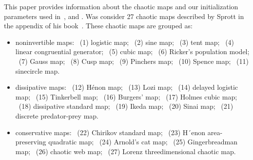 \documentclass[11pt]{article}
\begin{document}
This paper provides information about the chaotic maps and our initialization parameters used in~, and .
Was consider 27 chaotic maps described by Sprott in the appendix of his book~\cite{sprott2003chaos}. 
These chaotic maps are grouped as:
\begin{itemize}
    \item noninvertible maps: 
    ~(1) logistic map; 
    ~(2) sine map; 
    ~(3) tent map; 
    ~(4) linear congruential generator; 
    ~(5) cubic map; 
    ~(6) Ricker’s population model; 
    ~(7) Gauss map; 
    ~(8) Cusp map; 
    ~(9) Pinchers map; 
    ~(10) Spence map; 
    ~(11) sinecircle map.
    \item  dissipative maps: 
    ~(12) Hénon map; 
    ~(13) Lozi map;
    ~(14) delayed logistic map; 
    ~(15) Tinkerbell map; 
    ~(16) Burgers’ map; 
    ~(17) Holmes cubic map; 
    ~(18) dissipative standard map; 
    ~(19) Ikeda map; 
    ~(20) Sinai map; 
    ~(21) discrete predator-prey map.
    \item conservative maps: 
    ~(22) Chirikov standard map; 
    ~(23) H´enon area-preserving quadratic map; 
    ~(24) Arnold’s cat map; 
    ~(25) Gingerbreadman map; 
    ~(26) chaotic web map; 
    ~(27) Lorenz threedimensional chaotic map.
\end{itemize}
\newpage





\newpage


\end{document}
